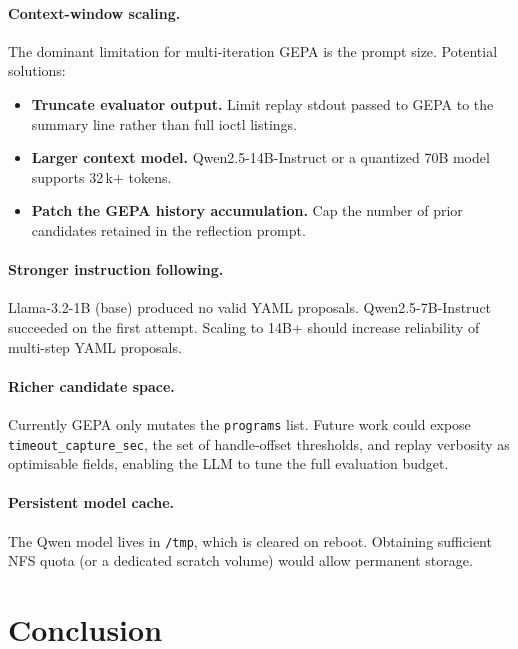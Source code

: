 \documentclass[11pt,a4paper]{article}
\begin{document}
\paragraph{Context-window scaling.}
The dominant limitation for multi-iteration GEPA is the prompt size.
Potential solutions:
\begin{itemize}[leftmargin=*]
  \item \textbf{Truncate evaluator output.} Limit replay stdout passed to
        GEPA to the summary line rather than full ioctl listings.
  \item \textbf{Larger context model.} Qwen2.5-14B-Instruct or a quantized
        70B model supports 32\,k$+$ tokens.
  \item \textbf{Patch the GEPA history accumulation.} Cap the number of
        prior candidates retained in the reflection prompt.
\end{itemize}

\paragraph{Stronger instruction following.}
Llama-3.2-1B (base) produced no valid YAML proposals.
Qwen2.5-7B-Instruct succeeded on the first attempt.
Scaling to 14B+ should increase reliability of multi-step YAML proposals.

\paragraph{Richer candidate space.}
Currently GEPA only mutates the \texttt{programs} list.
Future work could expose \texttt{timeout\_capture\_sec}, the set of
handle-offset thresholds, and replay verbosity as optimisable fields,
enabling the LLM to tune the full evaluation budget.

\paragraph{Persistent model cache.}
The Qwen model lives in \texttt{/tmp}, which is cleared on reboot.
Obtaining sufficient NFS quota (or a dedicated scratch volume) would allow
permanent storage.

\section{Conclusion}
\end{document}
